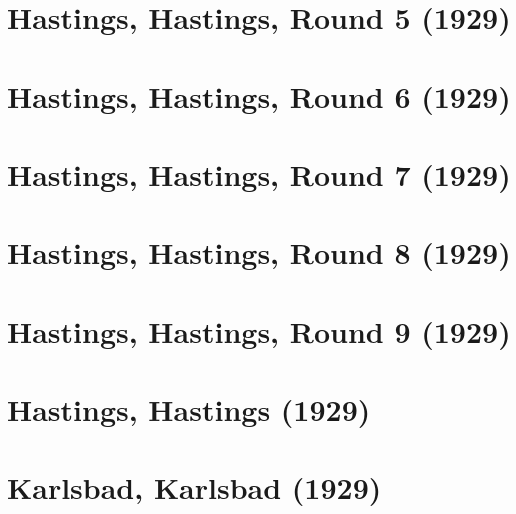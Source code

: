 \documentclass[11pt]{article}
\begin{document}
\clearpage

\section{Hastings, Hastings, Round 5 (1929)}


\clearpage

\section{Hastings, Hastings, Round 6 (1929)}


\clearpage

\section{Hastings, Hastings, Round 7 (1929)}


\clearpage

\section{Hastings, Hastings, Round 8 (1929)}


\clearpage

\section{Hastings, Hastings, Round 9 (1929)}


\clearpage

\section{Hastings, Hastings (1929)}


\clearpage

\section{Karlsbad, Karlsbad (1929)}


\clearpage



\clearpage



\clearpage



\clearpage
\end{document}
